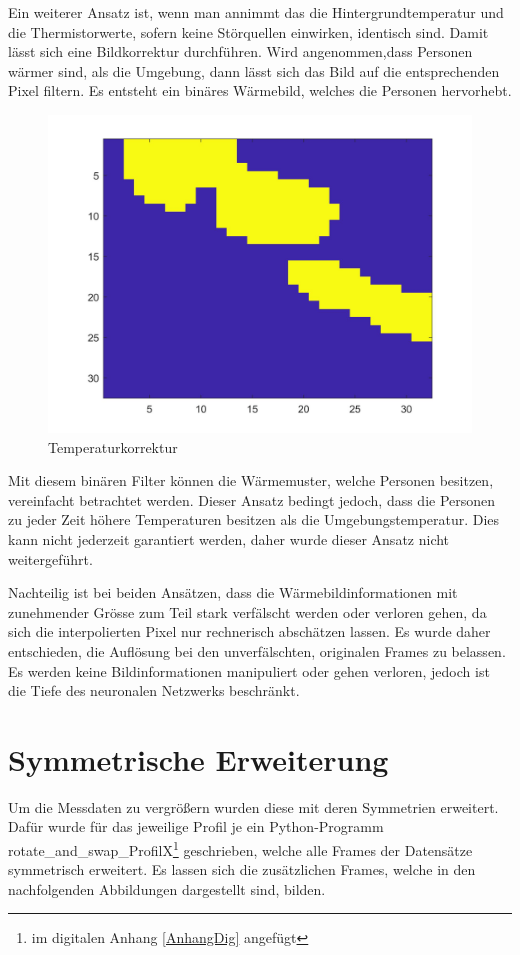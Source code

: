 Ein weiterer Ansatz ist, wenn man annimmt das die Hintergrundtemperatur und die Thermistorwerte, sofern keine Störquellen einwirken, identisch sind. Damit lässt sich eine Bildkorrektur durchführen. Wird angenommen,dass Personen wärmer sind, als die Umgebung, dann lässt sich das Bild auf die entsprechenden Pixel filtern. Es entsteht ein binäres Wärmebild, welches die Personen hervorhebt. 

\begin{figure}[H]
	\centering
	\includegraphics[width=0.5\linewidth]{fig/interpol_3}
    \caption[Temperaturkorrektur]{Temperaturkorrektur}
   \label{fig:interpol3}
\end{figure}

Mit diesem binären Filter können die Wärmemuster, welche Personen besitzen, vereinfacht betrachtet werden. Dieser Ansatz bedingt jedoch, dass die Personen zu jeder Zeit höhere Temperaturen besitzen als die Umgebungstemperatur. Dies kann nicht jederzeit garantiert werden, daher wurde dieser Ansatz nicht weitergeführt.

Nachteilig ist bei beiden Ansätzen, dass die Wärmebildinformationen mit zunehmender Grösse zum Teil stark verfälscht werden oder verloren gehen, da sich die interpolierten Pixel nur rechnerisch abschätzen lassen. Es wurde daher entschieden, die Auflösung bei den unverfälschten, originalen Frames zu belassen. Es werden keine Bildinformationen manipuliert  oder gehen verloren, jedoch ist die Tiefe des neuronalen Netzwerks beschränkt.

\section{Symmetrische Erweiterung}
\label{sec:Symmetrische Erweiterung}

Um die Messdaten zu vergrößern wurden diese mit deren Symmetrien erweitert. Dafür wurde für das jeweilige Profil je ein Python-Programm rotate\_and\_swap\_ProfilX\footnote{im digitalen Anhang \ref{AnhangDig} angefügt}  geschrieben, welche alle Frames der Datensätze symmetrisch erweitert.  Es lassen sich die zusätzlichen Frames, welche in den nachfolgenden Abbildungen dargestellt sind, bilden.

